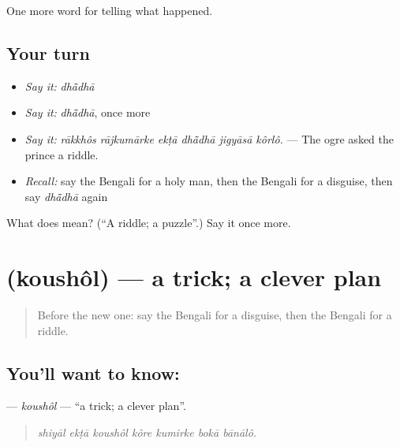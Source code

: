 \begin{grammarlens}[title={What you've built}]
One more word for telling what happened.
\end{grammarlens}

\subsection*{Your turn}
\begin{itemize}
\raggedright
  \item \emph{Say it:} \emph{dhā̃dhā}
  \item \emph{Say it:} \emph{dhā̃dhā}, once more
  \item \emph{Say it:} \emph{rākkhôs rājkumārke ekṭā dhā̃dhā jigyāsā kôrlô.} — The ogre asked the prince a riddle.
  \item \emph{Recall:} say the Bengali for a holy man, then the Bengali for a disguise, then say \emph{dhā̃dhā} again
\end{itemize}

\begin{tcolorbox}[breakable,colback=teal!4,colframe=teal!35!black,title={Before you move on}]
What does  mean? (\textquotedblleft{}A riddle; a puzzle\textquotedblright{}.) Say it once more.
\end{tcolorbox}
\section[\texorpdfstring{\bn{কৌশল} (koushôl)}{কৌশল (koushôl)}]{ (koushôl) — a trick; a clever plan}

\label{lesson:BN-C324-koushol}



\begin{quote}
Before the new one: say the Bengali for a disguise, then the Bengali for a riddle.
\end{quote}

\subsection*{You'll want to know: }
\textbf{} — \emph{koushôl} — \textquotedblleft{}a trick; a clever plan\textquotedblright{}.

\begin{quote}
      
\end{quote}

\begin{quote}
\emph{shiyāl ekṭā koushôl kôre kumirke bokā bānālô.}
\end{quote}

